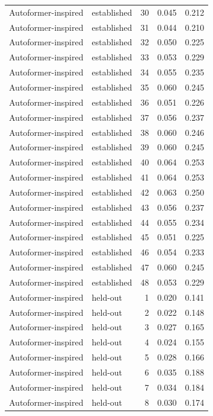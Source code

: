 \begin{tabular}{llrrr}
Autoformer-inspired & established & 30 & 0.045 & 0.212 \\
Autoformer-inspired & established & 31 & 0.044 & 0.210 \\
Autoformer-inspired & established & 32 & 0.050 & 0.225 \\
Autoformer-inspired & established & 33 & 0.053 & 0.229 \\
Autoformer-inspired & established & 34 & 0.055 & 0.235 \\
Autoformer-inspired & established & 35 & 0.060 & 0.245 \\
Autoformer-inspired & established & 36 & 0.051 & 0.226 \\
Autoformer-inspired & established & 37 & 0.056 & 0.237 \\
Autoformer-inspired & established & 38 & 0.060 & 0.246 \\
Autoformer-inspired & established & 39 & 0.060 & 0.245 \\
Autoformer-inspired & established & 40 & 0.064 & 0.253 \\
Autoformer-inspired & established & 41 & 0.064 & 0.253 \\
Autoformer-inspired & established & 42 & 0.063 & 0.250 \\
Autoformer-inspired & established & 43 & 0.056 & 0.237 \\
Autoformer-inspired & established & 44 & 0.055 & 0.234 \\
Autoformer-inspired & established & 45 & 0.051 & 0.225 \\
Autoformer-inspired & established & 46 & 0.054 & 0.233 \\
Autoformer-inspired & established & 47 & 0.060 & 0.245 \\
Autoformer-inspired & established & 48 & 0.053 & 0.229 \\
Autoformer-inspired & held-out & 1 & 0.020 & 0.141 \\
Autoformer-inspired & held-out & 2 & 0.022 & 0.148 \\
Autoformer-inspired & held-out & 3 & 0.027 & 0.165 \\
Autoformer-inspired & held-out & 4 & 0.024 & 0.155 \\
Autoformer-inspired & held-out & 5 & 0.028 & 0.166 \\
Autoformer-inspired & held-out & 6 & 0.035 & 0.188 \\
Autoformer-inspired & held-out & 7 & 0.034 & 0.184 \\
Autoformer-inspired & held-out & 8 & 0.030 & 0.174 \\

\end{tabular}
